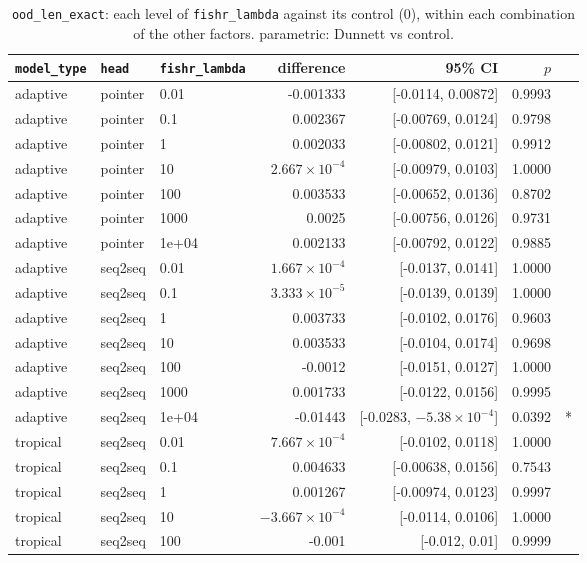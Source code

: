 \documentclass[10pt]{article}
\begin{document}
{\small
\begin{longtable}{lllrrrl}
\caption{\texttt{ood\_len\_exact}: each level of \texttt{fishr\_lambda} against its control (0), within each combination of the other factors. parametric: Dunnett vs control.}\label{tab:control-ood_len_exact}\\
\toprule
\texttt{model\_type} & \texttt{head} & \texttt{fishr\_lambda} & difference & 95\% CI & $p$ & \\
\midrule
\endhead
adaptive & pointer & 0.01 & -0.001333 & [-0.0114, 0.00872] & 0.9993 & \\
adaptive & pointer & 0.1 & 0.002367 & [-0.00769, 0.0124] & 0.9798 & \\
adaptive & pointer & 1 & 0.002033 & [-0.00802, 0.0121] & 0.9912 & \\
adaptive & pointer & 10 & $2.667\times10^{-4}$ & [-0.00979, 0.0103] & 1.0000 & \\
adaptive & pointer & 100 & 0.003533 & [-0.00652, 0.0136] & 0.8702 & \\
adaptive & pointer & 1000 & 0.0025 & [-0.00756, 0.0126] & 0.9731 & \\
adaptive & pointer & 1e+04 & 0.002133 & [-0.00792, 0.0122] & 0.9885 & \\
adaptive & seq2seq & 0.01 & $1.667\times10^{-4}$ & [-0.0137, 0.0141] & 1.0000 & \\
adaptive & seq2seq & 0.1 & $3.333\times10^{-5}$ & [-0.0139, 0.0139] & 1.0000 & \\
adaptive & seq2seq & 1 & 0.003733 & [-0.0102, 0.0176] & 0.9603 & \\
adaptive & seq2seq & 10 & 0.003533 & [-0.0104, 0.0174] & 0.9698 & \\
adaptive & seq2seq & 100 & -0.0012 & [-0.0151, 0.0127] & 1.0000 & \\
adaptive & seq2seq & 1000 & 0.001733 & [-0.0122, 0.0156] & 0.9995 & \\
adaptive & seq2seq & 1e+04 & -0.01443 & [-0.0283, $-5.38\times10^{-4}$] & 0.0392 & *\\
tropical & seq2seq & 0.01 & $7.667\times10^{-4}$ & [-0.0102, 0.0118] & 1.0000 & \\
tropical & seq2seq & 0.1 & 0.004633 & [-0.00638, 0.0156] & 0.7543 & \\
tropical & seq2seq & 1 & 0.001267 & [-0.00974, 0.0123] & 0.9997 & \\
tropical & seq2seq & 10 & $-3.667\times10^{-4}$ & [-0.0114, 0.0106] & 1.0000 & \\
tropical & seq2seq & 100 & -0.001 & [-0.012, 0.01] & 0.9999 & \\

\end{longtable}}
\end{document}
